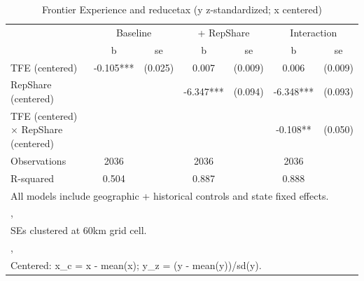 \begin{table}[htbp]\centering
\def\sym#1{\ifmmode^{#1}\else\(^{#1}\)\fi}
\caption{Frontier Experience and reducetax (y z-standardized; x centered)}
\begin{tabular}{l*{3}{cc}}
\toprule
                &\multicolumn{2}{c}{Baseline}&\multicolumn{2}{c}{ + RepShare}&\multicolumn{2}{c}{Interaction}\\
                &        b   &       se&        b   &       se&        b   &       se\\
\midrule
TFE (centered)  &   -0.105***&  (0.025)&    0.007   &  (0.009)&    0.006   &  (0.009)\\
RepShare (centered)&            &         &   -6.347***&  (0.094)&   -6.348***&  (0.093)\\
TFE (centered) $\times$ RepShare (centered)&            &         &            &         &   -0.108** &  (0.050)\\
\midrule
Observations    &     2036   &         &     2036   &         &     2036   &         \\
R-squared       &    0.504   &         &    0.887   &         &    0.888   &         \\
\bottomrule
\multicolumn{7}{l}{\footnotesize All models include geographic + historical controls and state fixed effects.}\\
\multicolumn{7}{l}{\footnotesize ,}\\
\multicolumn{7}{l}{\footnotesize SEs clustered at 60km grid cell.}\\
\multicolumn{7}{l}{\footnotesize ,}\\
\multicolumn{7}{l}{\footnotesize Centered: x\_c = x - mean(x); y\_z = (y - mean(y))/sd(y).}\\
\end{tabular}
\end{table}
